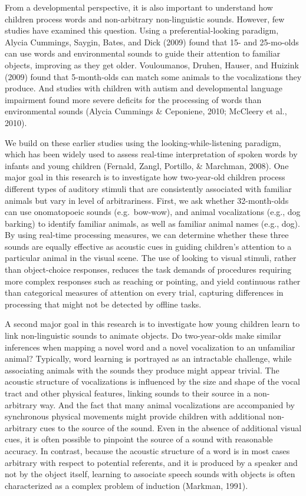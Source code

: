 \documentclass[english,floatsintext,man]{apa6}
\theoremstyle{definition}
\theoremstyle{definition}
\theoremstyle{definition}
\theoremstyle{remark}
\begin{document}
From a developmental perspective, it is also important to understand how
children process words and non-arbitrary non-linguistic sounds. However,
few studies have examined this question. Using a preferential-looking
paradigm, Alycia Cummings, Saygin, Bates, and Dick (2009) found that 15-
and 25-mo-olds can use words and environmental sounds to guide their
attention to familiar objects, improving as they get older. Vouloumanos,
Druhen, Hauser, and Huizink (2009) found that 5-month-olds can match
some animals to the vocalizations they produce. And studies with
children with autism and developmental language impairment found more
severe deficits for the processing of words than environmental sounds
(Alycia Cummings \& Ceponiene, 2010; McCleery et al., 2010).

We build on these earlier studies using the looking-while-listening
paradigm, which has been widely used to assess real-time interpretation
of spoken words by infants and young children (Fernald, Zangl, Portillo,
\& Marchman, 2008). One major goal in this research is to investigate
how two-year-old children process different types of auditory stimuli
that are consistently associated with familiar animals but vary in level
of arbitrariness. First, we ask whether 32-month-olds can use
onomatopoeic sounds (e.g.~bow-wow), and animal vocalizations (e.g., dog
barking) to identify familiar animals, as well as familiar animal names
(e.g., dog). By using real-time processing measures, we can determine
whether these three sounds are equally effective as acoustic cues in
guiding children's attention to a particular animal in the visual scene.
The use of looking to visual stimuli, rather than object-choice
responses, reduces the task demands of procedures requiring more complex
responses such as reaching or pointing, and yield continuous rather than
categorical measures of attention on every trial, capturing differences
in processing that might not be detected by offline tasks.

A second major goal in this research is to investigate how young
children learn to link non-linguistic sounds to animate objects. Do
two-year-olds make similar inferences when mapping a novel word and a
novel vocalization to an unfamiliar animal? Typically, word learning is
portrayed as an intractable challenge, while associating animals with
the sounds they produce might appear trivial. The acoustic structure of
vocalizations is influenced by the size and shape of the vocal tract and
other physical features, linking sounds to their source in a
non-arbitrary way. And the fact that many animal vocalizations are
accompanied by synchronous physical movements might provide children
with additional non-arbitrary cues to the source of the sound. Even in
the absence of additional visual cues, it is often possible to pinpoint
the source of a sound with reasonable accuracy. In contrast, because the
acoustic structure of a word is in most cases arbitrary with respect to
potential referents, and it is produced by a speaker and not by the
object itself, learning to associate speech sounds with objects is often
characterized as a complex problem of induction (Markman, 1991).
\end{document}
